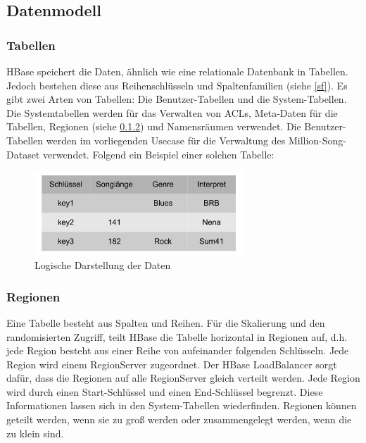 \subsection{Datenmodell} %
\subsubsection{Tabellen}
HBase speichert die Daten, ähnlich wie eine relationale Datenbank in Tabellen. Jedoch bestehen diese aus Reihenschlüsseln und Spaltenfamilien (siehe \ref{sf}). Es gibt zwei Arten von Tabellen: Die Benutzer-Tabellen und die System-Tabellen.
Die Systemtabellen werden für das Verwalten von \acp{ACL}, Meta-Daten für die Tabellen, Regionen (siehe \ref{region}) und Namensräumen verwendet. Die Benutzer-Tabellen werden im vorliegenden Usecase für die Verwaltung des Million-Song-Dataset verwendet. Folgend ein Beispiel einer solchen Tabelle:

\begin{figure}[htbp] 
  \centering
     \includegraphics[width=0.7\textwidth]{images/logisch.pdf}
  \caption{Logische Darstellung der Daten}
  \label{fig:Logische Darstellung der Daten}
\end{figure}



\subsubsection{Regionen}\label{region}
Eine Tabelle besteht aus Spalten und Reihen. Für die Skalierung  und den randomisierten Zugriff, teilt HBase die Tabelle horizontal in Regionen auf, d.h. jede Region besteht aus einer Reihe von aufeinander folgenden Schlüsseln. Jede Region wird einem RegionServer zugeordnet. Der HBase LoadBalancer sorgt dafür, dass die Regionen auf alle RegionServer gleich verteilt werden. Jede Region wird durch einen Start-Schlüssel und einen End-Schlüssel begrenzt. Diese Informationen lassen sich in den System-Tabellen wiederfinden. Regionen können geteilt werden, wenn sie zu groß werden oder zusammengelegt werden, wenn die zu klein sind.

